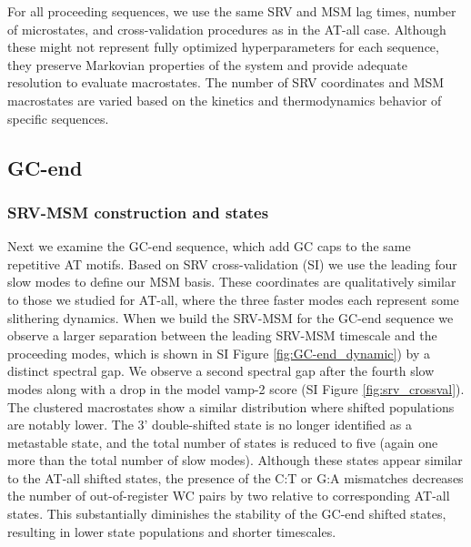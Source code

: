 \documentclass[journal=jpcbfk,manuscript=article]{achemso}
\begin{document}
For all proceeding sequences, we use the same SRV and MSM lag times, number of microstates, and cross-validation procedures as in the AT-all case. Although these might not represent fully optimized hyperparameters for each sequence, they preserve Markovian properties of the system and provide adequate resolution to evaluate macrostates. The number of SRV coordinates and MSM macrostates are varied based on the kinetics and thermodynamics behavior of specific sequences.


\subsection{\label{sec:Results}GC-end}

\subsubsection{\label{sec:Results}SRV-MSM construction and states}
	
Next we examine the GC-end sequence, which add GC caps to the same repetitive AT motifs. Based on SRV cross-validation (SI) we use the leading four slow modes to define our MSM basis.  These coordinates are qualitatively similar to those we studied for AT-all, where the three faster modes each represent some slithering dynamics. When we build the SRV-MSM for the GC-end sequence we observe a larger separation between the leading SRV-MSM timescale and the proceeding modes, which is shown in SI Figure \ref{fig:GC-end_dynamic}) by a distinct spectral gap. We observe a second spectral gap after the fourth slow modes along with a drop in the model vamp-2 score (SI Figure \ref{fig:srv_crossval}). The clustered macrostates show a similar distribution where shifted populations are notably lower. The 3' double-shifted state is no longer identified as a metastable state, and the total number of states is reduced to five (again one more than the total number of slow modes). Although these states appear similar to the AT-all shifted states, the presence of the C:T or G:A mismatches decreases the number of out-of-register WC pairs by two relative to corresponding AT-all states. This substantially diminishes the stability of the GC-end shifted states, resulting in lower state populations and shorter timescales.
\end{document}
